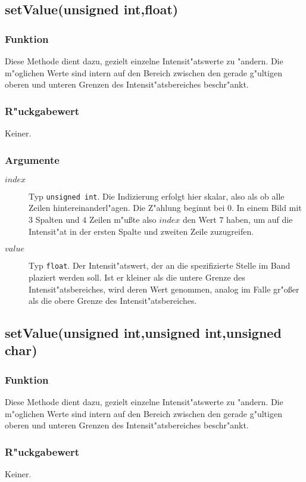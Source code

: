 \documentclass[12pt,a4paper,draft,twoside,onecolumn,titlepage]{book}
\newcommand{\carg}[1]{$ #1 $}
\newcommand{\ctyp}[1]{{\tt #1}}
\newcommand{\arglist}[1]{\footnotesize{#1}}
\begin{document}
\subsection{setValue\arglist{(unsigned int,float)}}
\subsubsection{Funktion}
Diese Methode dient dazu, gezielt einzelne Intensit"atswerte zu "andern. Die m"oglichen Werte sind intern auf den Bereich zwischen den gerade g"ultigen oberen und unteren Grenzen des Intensit"atsbereiches beschr"ankt.
\subsubsection{R"uckgabewert}
Keiner.
\subsubsection{Argumente} 
\begin{description}
\item[\carg{index}]{Typ \ctyp{unsigned int}.  Die Indizierung erfolgt hier skalar, also als ob alle Zeilen hintereinanderl"agen. Die Z"ahlung beginnt bei $0$. In einem Bild mit $3$ Spalten und $4$ Zeilen m"u{\ss}te also \carg{index} den Wert $7$ haben, um auf die Intensit"at in der ersten Spalte und zweiten Zeile zuzugreifen.} 
\item[\carg{value}]{Typ \ctyp{float}. Der Intensit"atswert, der an die spezifizierte Stelle im Band plaziert werden soll. Ist er kleiner als die untere Grenze des Intensit"atsbereiches, wird deren Wert genommen, analog im Falle gr"o{\ss}er als die obere Grenze des Intensit"atsbereiches.}
\end{description}
\subsection{setValue\arglist{(unsigned int,unsigned int,unsigned char)}}
\subsubsection{Funktion}
Diese Methode dient dazu, gezielt einzelne Intensit"atswerte zu "andern. Die m"oglichen Werte sind intern auf den Bereich zwischen den gerade g"ultigen oberen und unteren Grenzen des Intensit"atsbereiches beschr"ankt.
\subsubsection{R"uckgabewert}
Keiner.
\end{document}
